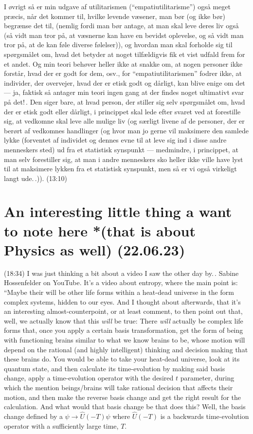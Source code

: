 \documentclass{report}
\begin{document}
I øvrigt så er min udgave af utilitarismen (``empatiutilitarisme'') også meget præcis, når det kommer til, hvilke levende væsener, man bør (og ikke bør) begrænse det til, (nemlig fordi man bør antage, at man skal leve deres liv også (så vidt man tror på, at væsnerne kan have en bevidst oplevelse, og så vidt man tror på, at de kan føle diverse følelser)), og hvordan man skal forholde sig til spørgsmålet om, hvad det betyder at noget tilfældigvis fik et vist udfald frem for et andet. Og min teori behøver heller ikke at snakke om, at nogen personer ikke forstår, hvad der er godt for dem, osv., for ``empatiutilitarismen'' fodrer ikke, at individer, der overvejer, hvad der er etisk godt og dårligt, kan blive enige om det --- ja, faktisk så antager min teori ingen gang at der findes noget ultimativt svar på det!\,. Den siger bare, at hvad person, der stiller sig selv spørgsmålet om, hvad der er etisk godt eller dårligt, i princippet skal lede efter svaret ved at forestille sig, at vedkomne skal leve alle mulige liv (og særligt livene af de personer, der er berørt af vedkomnes handlinger (og hvor man jo gerne vil maksimere den samlede lykke (forventet af individet og dennes evne til at leve sig ind i disse andre menneskers sted) ud fra et statistisk synspunkt --- medmindre, i princippet, at man selv forestiller sig, at man i andre menneskers sko heller ikke ville have lyst til at maksimere lykken fra et statistisk synspunkt, men så er vi også virkeligt langt ude.\,.)). (13:10)




\section{An interesting little thing a want to note here *(that is about Physics as well) (22.06.23)}
(18:34) I was just thinking a bit about a video I saw the other day by.\,. 
Sabine Hossenfelder on YouTube. It's a video about entropy, where the main point is: ``Maybe their will be other life forms within a heat-dead universe in the form complex systems, hidden to our eyes. And I thought about afterwards, that it's an interesting almost-counterpoint, or at least comment, to then point out that, well, we actually know that this \emph{will} be true: There \emph{will} actually be complex life forms that, once you apply a certain basis transformation, get the form of being with functioning brains similar to what we know brains to be, whose motion will depend on the rational (and highly intelligent) thinking and decision making that these brains do. You would be able to take your heat-dead universe, look at its quantum state, and then calculate its time-evolution by making said basis change, apply a time-evolution operator with the desired $t$ parameter, during which the mention beings/brains will take rational decision that affects their motion, and then make the reverse basis change and get the right result for the calculation. And what would that basis change be that does this? Well, the basis change defined by a $\psi \to \hat U (-T)\psi$ where $\hat U (-T)$ is a backwards time-evolution operator with a sufficiently large time, $T$.
\end{document}
